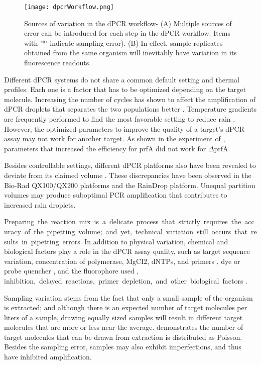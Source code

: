 \begin{figure}[h]
    \centering
    \texttt{[image: dpcrWorkflow.png]}
    \caption[Sources of variation in the dPCR workflow]%
    {Sources of variation in the dPCR workflow- (A) Multiple sources of error can be introduced for each step in the dPCR workflow. Items with '*' indicate sampling error). (B) In effect, sample replicates obtained from the same organism will inevitably have variation in its fluorescence readouts. }
        \label{fig:dpcrWorkflow}
\end{figure}

Different dPCR systems do not share a common default setting and thermal profiles. Each one is a factor that has to be optimized depending on the target molecule. Increasing the number of cycles has shown to affect the amplification of dPCR droplets that separates the two populations better \cite{Koppel2015}. Temperature gradients are frequently performed to find the most favorable setting to reduce rain \cite{Gerdes2016}. However, the optimized parameters to improve the quality of a target's dPCR assay may not work for another target. As shown in the experiment of , parameters that increased the efficiency for prfA did not work for \(\Delta\)prfA.

Besides controllable settings, different dPCR platforms also have been revealed to deviate from its claimed volume \cite{Pinheiro2012,Dong2015,Corbisier2015,Dagata2016,Kosir2017}. These discrepancies have been observed in the Bio-Rad QX100/QX200 platforms and the RainDrop platform. Unequal partition volumes may produce suboptimal PCR amplification that contributes to increased rain droplets.

Preparing the reaction mix is a delicate process that strictly requires the accuracy of the pipetting volume; and yet, technical variation still occurs that results in pipetting errors. In addition to physical variation, chemical and biological factors play a role in the dPCR assay quality, such as target sequence variation, concentration of polymerase, MgCI2, dNTPs, and primers \cite{Koppel2015, Kramer2001}, dye or probe quencher \cite{Witte2016}, and the fluorophore used \cite{Gerdes2016}, inhibition, delayed reactions, primer depletion, and other biological factors \cite{Jacobs2014}.

Sampling variation stems from the fact that only a small sample of the organism is extracted; and although there is an expected number of target molecules per liters of a sample, drawing equally sized samples will result in different target molecules that are more or less near the average.  demonstrates the number of target molecules that can be drawn from extraction is distributed as Poisson. Besides the sampling error, samples may also exhibit imperfections, and thus have inhibited amplification. 

